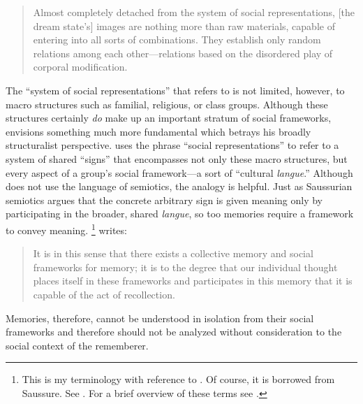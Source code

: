 \begin{quote}
    Almost completely detached from the system of social representations, {[}the dream state's{]} images are nothing more than raw materials, capable of entering into all sorts of combinations. They establish only random relations among each other---relations based on the disordered play of corporal modification.%
        \autocite[42]{halbwachs1992}
\end{quote}  
\noindent
The ``system of social representations'' that \halbwachs refers to is not limited, however, to macro structures such as familial, religious, or class groups. Although these structures certainly \emph{do} make up an important stratum of social frameworks, \halbwachs envisions something much more fundamental which betrays his broadly structuralist perspective. \halbwachs uses the phrase ``social representations'' to refer to a system of shared ``signs'' that encompasses not only these macro structures, but every aspect of a group's social framework---a sort of ``cultural \emph{langue}.'' Although \halbwachs does not use the language of semiotics, the analogy is helpful. Just as Saussurian semiotics argues that the concrete arbitrary sign is given meaning only by participating in the broader, shared \emph{langue}, so too memories require a framework to convey meaning.%
    \footnote{%
        This is my terminology with reference to \halbwachs. Of course, it is borrowed from Saussure. See 
        \cite{saussure1916}. For a brief overview of these terms see 
        \cite[93--94]{smith-riley2009}.}
%
\halbwachs writes:  

\begin{quote}
    It is in this sense that there exists a collective memory and social frameworks for memory; it is to the degree that our individual thought places itself in these frameworks and participates in this memory that it is capable of the act of recollection.%
        \autocite[38]{halbwachs1992}
\end{quote}  
\noindent
Memories, therefore, cannot be understood in isolation from their social frameworks and therefore should not be analyzed without consideration to the social context of the rememberer.  

